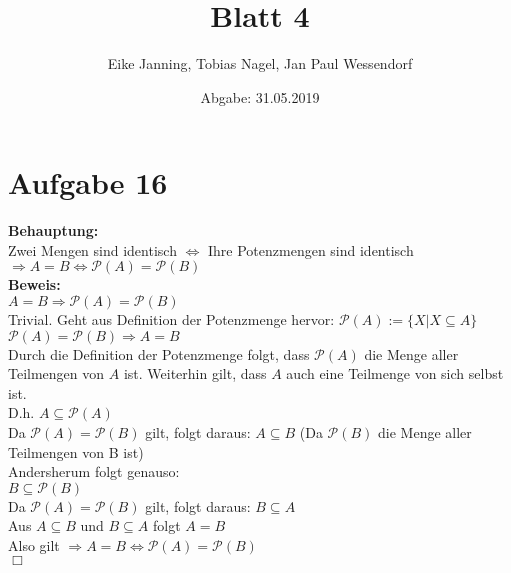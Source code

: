 \documentclass[paper = a4, ngerman]{scrartcl}
\title{Blatt 4}
\author{Eike Janning, Tobias Nagel, Jan Paul Wessendorf}
\date{Abgabe: 31.05.2019}
\begin{document}
	\maketitle
	\hrulefill
	
	\section*{Aufgabe 16}
	
	\textbf{Behauptung:}\\
	Zwei Mengen sind identisch $\Leftrightarrow$ Ihre Potenzmengen sind identisch\\
	
	$\Rightarrow A = B \Leftrightarrow \mathcal{P}(A) = \mathcal{P}(B) $\\
	
	\textbf{Beweis:}\\
	$ A = B \Rightarrow \mathcal{P}(A) = \mathcal{P}(B) $\\
	Trivial. Geht aus Definition der Potenzmenge hervor: $\mathcal{P}(A) := \{ X | X \subseteq A\}$\\
	
	$\mathcal{P}(A) = \mathcal{P}(B) \Rightarrow A = B$\\
	
	Durch die Definition der Potenzmenge folgt, dass $\mathcal{P}(A)$ die Menge aller Teilmengen von $A$ ist. Weiterhin gilt, dass $A$ auch eine Teilmenge von sich selbst ist.\\
	D.h. $A \subseteq \mathcal{P}(A)$\\
	Da $\mathcal{P}(A) = \mathcal{P}(B)$ gilt, folgt daraus: $A \subseteq B$  (Da $\mathcal{P}(B)$ die Menge aller Teilmengen von B ist)\\
	
	Andersherum folgt genauso:\\
	$B \subseteq \mathcal{P}(B)$\\
	Da $\mathcal{P}(A) = \mathcal{P}(B)$ gilt, folgt daraus: $B \subseteq A$\\
	
	Aus $A \subseteq B$ und $B \subseteq A$ folgt $A = B$\\
	
	Also gilt 	$\Rightarrow A = B \Leftrightarrow \mathcal{P}(A) = \mathcal{P}(B) $\\
	
	\hfil$\Box$
	
	
	
	
	
\end{document}
